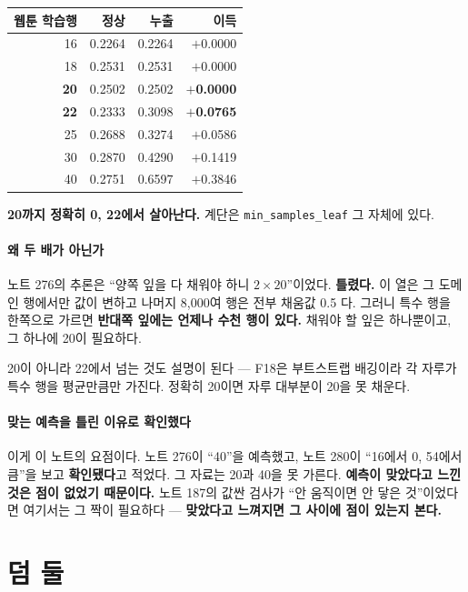 \documentclass[10pt]{article}
\begin{document}
\begin{center}\small
\begin{tabular}{rrrr}
\hline
웹툰 학습행 & 정상 & 누출 & 이득 \\
\hline
16 & 0.2264 & 0.2264 & $+$0.0000 \\
18 & 0.2531 & 0.2531 & $+$0.0000 \\
\textbf{20} & 0.2502 & 0.2502 & \textbf{$+$0.0000} \\
\textbf{22} & 0.2333 & 0.3098 & \textbf{$+$0.0765} \\
25 & 0.2688 & 0.3274 & $+$0.0586 \\
30 & 0.2870 & 0.4290 & $+$0.1419 \\
40 & 0.2751 & 0.6597 & $+$0.3846 \\
\hline
\end{tabular}
\end{center}

\textbf{20까지 정확히 0, 22에서 살아난다.} 계단은 \texttt{min\_samples\_leaf}
그 자체에 있다.

\paragraph{왜 두 배가 아닌가} 노트 276의 추론은 ``양쪽 잎을 다 채워야 하니
$2{\times}20$''이었다. \textbf{틀렸다.} 이 열은 그 도메인 행에서만 값이
변하고 나머지 8,000여 행은 전부 채움값 0.5 다. 그러니 특수 행을 한쪽으로
가르면 \textbf{반대쪽 잎에는 언제나 수천 행이 있다.} 채워야 할 잎은
하나뿐이고, 그 하나에 20이 필요하다.

20이 아니라 22에서 넘는 것도 설명이 된다 --- F18은 부트스트랩 배깅이라
각 자루가 특수 행을 평균만큼만 가진다. 정확히 20이면 자루 대부분이 20을
못 채운다.

\paragraph{맞는 예측을 틀린 이유로 확인했다} 이게 이 노트의 요점이다.
노트 276이 ``40''을 예측했고, 노트 280이 ``16에서 0, 54에서 큼''을 보고
\textbf{확인됐다}고 적었다. 그 자료는 20과 40을 못 가른다. \textbf{예측이
맞았다고 느낀 것은 점이 없었기 때문이다.} 노트 187의 값싼 검사가 ``안
움직이면 안 닿은 것''이었다면 여기서는 그 짝이 필요하다 --- \textbf{맞았다고
느껴지면 그 사이에 점이 있는지 본다.}

\section{덤 둘}
\end{document}
